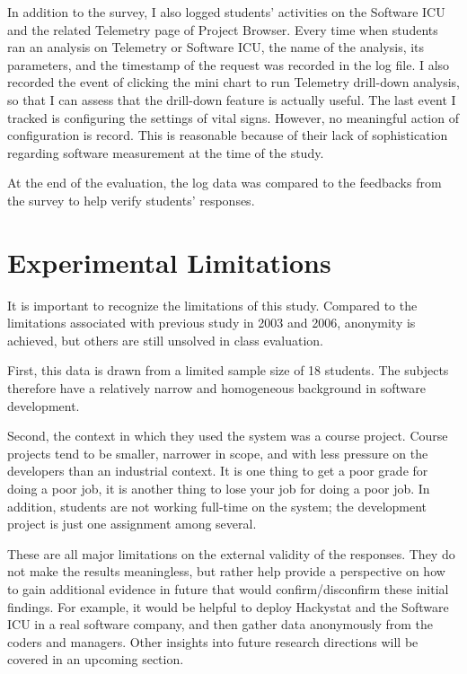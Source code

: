 In addition to the survey, I also logged students' activities on the Software ICU and the related Telemetry page of Project Browser. Every time when students ran an analysis on Telemetry or Software ICU, the name of the analysis, its parameters, and the timestamp of the request was recorded in the log file. I also recorded the event of clicking the mini chart to run Telemetry drill-down analysis, so that I can assess that the drill-down feature is actually useful. The last event I tracked is configuring the settings of vital signs. However, no meaningful action of configuration is record. This is reasonable because of their lack of sophistication regarding software measurement at the time of the study.

At the end of the evaluation, the log data was compared to the feedbacks from the survey to help verify students' responses.

\section {Experimental Limitations}

It is important to recognize the limitations of this study. Compared to the limitations associated with previous study in 2003 and 2006, anonymity is achieved, but others are still unsolved in class evaluation.

First, this data is drawn from a limited sample size of 18 students. The subjects therefore have a relatively narrow and homogeneous background in software development.

Second, the context in which they used the system was a course project.  Course projects tend to be smaller, narrower in scope, and with less pressure on the developers than an industrial context.  It is one thing to get a poor grade for doing a poor job, it is another thing to lose your job for doing a poor job.  In addition, students are not working full-time on the system; the development project is just one assignment among several.  

These are all major limitations on the external validity of the responses.  They do not make the results meaningless, but rather help provide a perspective on how to gain additional evidence in future that would confirm/disconfirm these initial findings.  For example, it would be helpful to deploy Hackystat and the Software ICU in a real software company, and then gather data anonymously from the coders and managers. Other insights into future research directions will be covered in an upcoming section.

